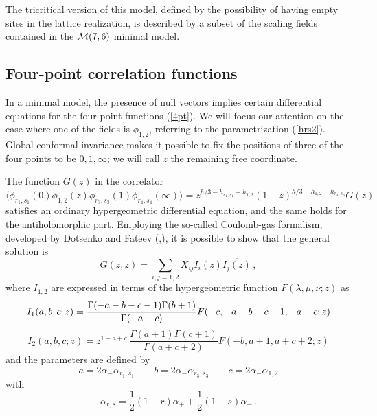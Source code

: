 \documentclass[a4paper,12pt]{report}
\begin{document}
The tricritical version of this model, defined by the possibility of having empty sites in the lattice
realization, is described by a subset of the scaling fields contained in the ${\cal M}(7,6)$ minimal model.

\vspace{0.5cm}

\subsection{Four-point correlation functions}

In a minimal model, the presence of null vectors implies certain differential equations for the four point
functions (\ref{4pt}). We will focus our attention on the case where one of the fields is $\phi_{1,2}$, referring
to the parametrization  (\ref{hrs2}). Global conformal invariance makes it possible to fix the positions of three
of the four points to be $0,1,\infty$; we will call $z$ the remaining free coordinate.

The function $G(z)$ in the correlator
\begin{equation}\label{G}
\langle\phi_{r_{1},s_{1}}(0)\phi_{1,2}(z)\phi_{r_{3},s_{3}}(1)\phi_{r_{4},s_{4}}(\infty)\rangle=z^{h/3-h_{r_{1},s_{1}}-h_{1,2}}(1-z)^{h/3-h_{1,2}-h_{r_{3},s_{3}}}G\left(z\right)
\end{equation}
satisfies an ordinary hypergeometric differential equation, and the same holds for the antiholomorphic part.
Employing the so-called Coulomb-gas formalism, developed by Dotsenko and Fateev (\cite{dosfat1},\cite{dosfat2}),
it is possible to show that the general solution is
\begin{equation}
G(z,\bar{z})=\sum_{i,j=1,2}X_{ij}I_{i}(z)\overline{I_{j}(z)}\, ,
\end{equation}
where $I_{1,2}$ are expressed in terms of the hypergeometric function $F(\lambda,\mu,\nu;z)$ as
\begin{displaymath}
I_{1}(a,b,c;z)=\frac{\Gamma(-a-b-c-1)\Gamma(b+1)}{\Gamma(-a-c)}F(-c,-a-b-c-1,-a-c;z)\\
\end{displaymath}
\begin{equation}
I_{2}(a,b,c;z)=z^{1+a+c}\,\frac{\Gamma(a+1)\Gamma(c+1)}{\Gamma(a+c+2)}F(-b,a+1,a+c+2;z) \label{I12}
\end{equation}
and the parameters are defined by
\begin{equation}
a=2\alpha_{-}\alpha_{r_{1},s_{1}}\qquad b=2\alpha_{-}\alpha_{r_{3},s_{3}}\qquad c=2\alpha_{-}\alpha_{1,2}
\end{equation}
with
\begin{equation}\label{alphars}
\alpha_{r,s}=\frac{1}{2}(1-r)\alpha_{+}+\frac{1}{2}(1-s)\alpha_{-}\,.
\end{equation}
\end{document}
